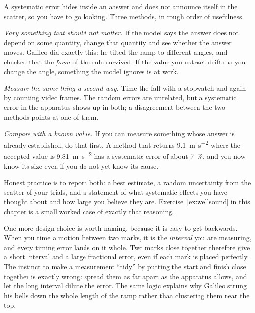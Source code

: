 \documentclass[11pt,twoside,openany]{book}
\newcounter{check}[chapter]
\begin{document}
\begin{modelnote}
A systematic error hides inside an answer and does not announce itself in the scatter, so you have to go looking. Three methods, in rough order of usefulness.

\emph{Vary something that should not matter.} If the model says the answer does not depend on some quantity, change that quantity and see whether the answer moves. Galileo did exactly this: he tilted the ramp to different angles, and checked that the \emph{form} of the rule survived. If the value you extract drifts as you change the angle, something the model ignores is at work.

\emph{Measure the same thing a second way.} Time the fall with a stopwatch and again by counting video frames. The random errors are unrelated, but a systematic error in the apparatus shows up in both; a disagreement between the two methods points at one of them.

\emph{Compare with a known value.} If you can measure something whose answer is already established, do that first. A method that returns \SI{9.1}{\metre\per\second\squared} where the accepted value is \SI{9.81}{\metre\per\second\squared} has a systematic error of about \SI{7}{\percent}, and you now know its size even if you do not yet know its cause.

Honest practice is to report both: a best estimate, a random uncertainty from the scatter of your trials, and a statement of what systematic effects you have thought about and how large you believe they are. Exercise~\ref{ex:wellsound} in this chapter is a small worked case of exactly that reasoning.
\end{modelnote}

\begin{modelnote}
One more design choice is worth naming, because it is easy to get backwards. When you time a motion between two marks, it is the \emph{interval} you are measuring, and every timing error lands on it whole. Two marks close together therefore give a short interval and a large fractional error, even if each mark is placed perfectly. The instinct to make a measurement ``tidy'' by putting the start and finish close together is exactly wrong: spread them as far apart as the apparatus allows, and let the long interval dilute the error. The same logic explains why Galileo strung his bells down the whole length of the ramp rather than clustering them near the top.
\end{modelnote}
\end{document}
